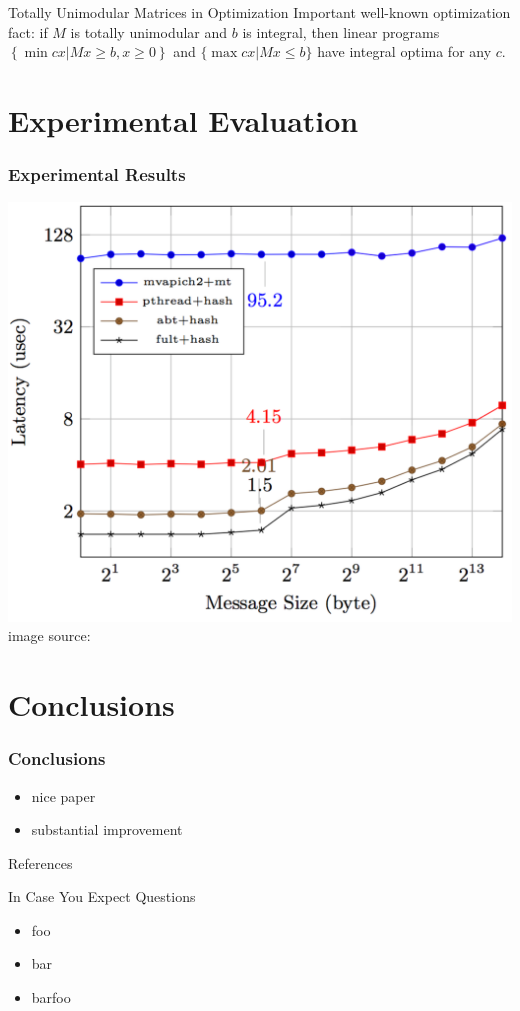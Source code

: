 \documentclass[presentation,professionalfonts]{beamer}
\begin{document}
\begin{frame}{Totally Unimodular Matrices in Optimization}
  Important well-known optimization fact: if \(M\) is totally
  unimodular and \(b\) is integral, then linear programs \(\left\{\min
  cx | Mx \geq b, x\geq 0\right\}\) and \(\{\max cx | Mx \leq b\}\)
  have integral optima for any \(c\).
  \end{frame}

\section{Experimental Evaluation}

\begin{frame}
  \frametitle{Experimental Results}
  \begin{center}
  \includegraphics[width=.7\textwidth]{./graph1}\\
  image source: \textcite{Dang16}
  \end{center}
\end{frame}

\section{Conclusions}

\begin{frame}
  \frametitle{Conclusions}
  \begin{itemize}
  \item nice paper 
  \item substantial improvement
  \end{itemize}  
\end{frame}


\begin{frame}[fragile]{References}
\printbibliography
\end{frame}

\appendix

\begin{frame}{In Case You Expect Questions}
\centering
\begin{itemize}
\item foo
\item bar
\item barfoo
\end{itemize}
\end{frame}
\end{document}
